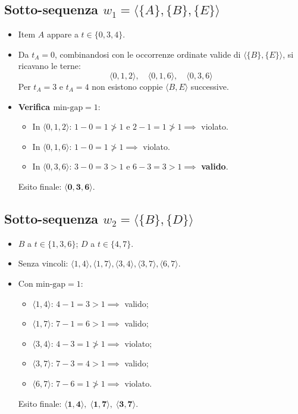 \subsection{Sotto-sequenza \texorpdfstring{$w_1 = \langle \{A\}, \{B\}, \{E\} \rangle$}{w1}}
\begin{itemize}
    \item Item $A$ appare a $t \in \{0, 3, 4\}$.
    \item Da $t_A = 0$, combinandosi con le occorrenze ordinate valide di $\langle \{B\}, \{E\} \rangle$, si ricavano le terne:
    \begin{equation}
    \langle 0, 1, 2 \rangle, \quad \langle 0, 1, 6 \rangle, \quad \langle 0, 3, 6 \rangle
    \end{equation}
    Per $t_A = 3$ e $t_A = 4$ non esistono coppie $\langle B, E \rangle$ successive.
    \item \textbf{Verifica $\text{min-gap} = 1$}:
    \begin{itemize}
        \item In $\langle 0, 1, 2 \rangle$: $1 - 0 = 1 \ngtr 1$ e $2 - 1 = 1 \ngtr 1 \implies$ violato.
        \item In $\langle 0, 1, 6 \rangle$: $1 - 0 = 1 \ngtr 1 \implies$ violato.
        \item In $\langle 0, 3, 6 \rangle$: $3 - 0 = 3 > 1$ e $6 - 3 = 3 > 1 \implies$ \textbf{valido}.
    \end{itemize}
    Esito finale: $\mathbf{\langle 0, 3, 6 \rangle}$.
\end{itemize}

\FloatBarrier
\subsection{Sotto-sequenza \texorpdfstring{$w_2 = \langle \{B\}, \{D\} \rangle$}{w2}}
\begin{itemize}
    \item $B$ a $t \in \{1, 3, 6\}$; $D$ a $t \in \{4, 7\}$.
    \item Senza vincoli: $\langle 1, 4 \rangle, \langle 1, 7 \rangle, \langle 3, 4 \rangle, \langle 3, 7 \rangle, \langle 6, 7 \rangle$.
    \item Con $\text{min-gap} = 1$:
    \begin{itemize}
        \item $\langle 1, 4 \rangle$: $4 - 1 = 3 > 1 \implies$ valido;
        \item $\langle 1, 7 \rangle$: $7 - 1 = 6 > 1 \implies$ valido;
        \item $\langle 3, 4 \rangle$: $4 - 3 = 1 \ngtr 1 \implies$ violato;
        \item $\langle 3, 7 \rangle$: $7 - 3 = 4 > 1 \implies$ valido;
        \item $\langle 6, 7 \rangle$: $7 - 6 = 1 \ngtr 1 \implies$ violato.
    \end{itemize}
    Esito finale: $\mathbf{\langle 1, 4 \rangle, \; \langle 1, 7 \rangle, \; \langle 3, 7 \rangle}$.
\end{itemize}

